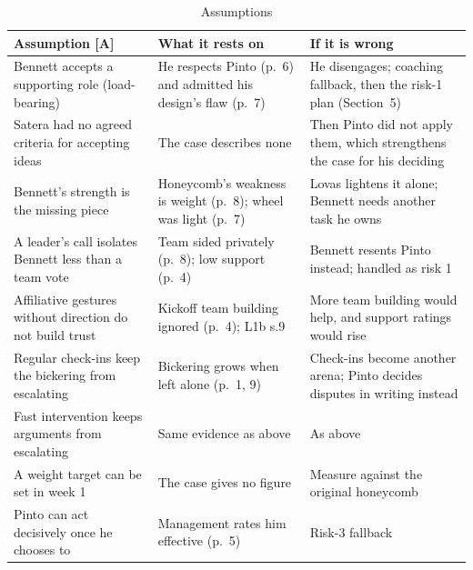 \documentclass[oneside,final,11pt,letterpaper]{article}
\begin{document}
\begin{table}[H]
\centering
\small
\caption{Assumptions}
\label{tab:assumptions}
\begin{tabularx}{\textwidth}{Y Y Y}
\toprule
\textbf{Assumption [A]} & \textbf{What it rests on} & \textbf{If it is wrong} \\
\midrule
Bennett accepts a supporting role (load-bearing) & He respects Pinto (p.~6) and admitted his design's flaw (p.~7) & He disengages; coaching fallback, then the risk-1 plan (Section~5) \\
Satera had no agreed criteria for accepting ideas & The case describes none & Then Pinto did not apply them, which strengthens the case for his deciding \\
Bennett's strength is the missing piece & Honeycomb's weakness is weight (p.~8); wheel was light (p.~7) & Lovas lightens it alone; Bennett needs another task he owns \\
A leader's call isolates Bennett less than a team vote & Team sided privately (p.~8); low support (p.~4) & Bennett resents Pinto instead; handled as risk 1 \\
Affiliative gestures without direction do not build trust & Kickoff team building ignored (p.~4); L1b s.9 & More team building would help, and support ratings would rise \\
Regular check-ins keep the bickering from escalating & Bickering grows when left alone (p.~1, 9) & Check-ins become another arena; Pinto decides disputes in writing instead \\
Fast intervention keeps arguments from escalating & Same evidence as above & As above \\
A weight target can be set in week 1 & The case gives no figure & Measure against the original honeycomb \\
Pinto can act decisively once he chooses to & Management rates him effective (p.~5) & Risk-3 fallback \\
\bottomrule
\end{tabularx}
\end{table}
\end{document}
